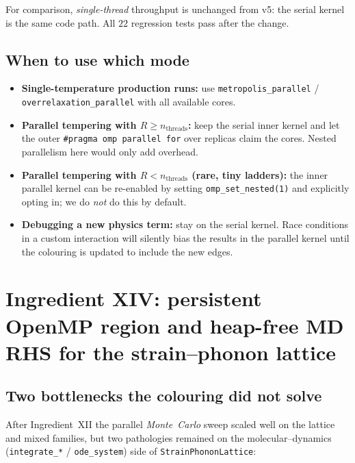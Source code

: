 \documentclass[11pt,letterpaper]{article}
\begin{document}
For comparison, \emph{single-thread} throughput is
unchanged from v5: the serial kernel is the same code path.  All
$22$ regression tests pass after the change.

\subsection{When to use which mode}

\begin{itemize}[noitemsep]
  \item \textbf{Single-temperature production runs:} use
        \texttt{metropolis\_parallel} / \texttt{overrelaxation\_parallel}
        with all available cores.
  \item \textbf{Parallel tempering with $R \ge n_{\text{threads}}$:}
        keep the serial inner kernel and let the outer
        \texttt{\#pragma omp parallel for} over replicas claim the
        cores.  Nested parallelism here would only add overhead.
  \item \textbf{Parallel tempering with $R < n_{\text{threads}}$
        (rare, tiny ladders):} the inner parallel kernel can be
        re-enabled by setting \texttt{omp\_set\_nested(1)} and
        explicitly opting in; we do \emph{not} do this by default.
  \item \textbf{Debugging a new physics term:} stay on the serial
        kernel.  Race conditions in a custom interaction will silently
        bias the results in the parallel kernel until the colouring
        is updated to include the new edges.
\end{itemize}

\section{Ingredient XIV: persistent OpenMP region and heap-free
MD RHS for the strain--phonon lattice}
\label{sec:rhs-heap-free}

\subsection{Two bottlenecks the colouring did not solve}

After Ingredient~XII the parallel \emph{Monte~Carlo} sweep scaled
well on the lattice and mixed families, but two pathologies
remained on the molecular--dynamics (\texttt{integrate\_*} /
\texttt{ode\_system}) side of \texttt{StrainPhononLattice}:
\end{document}

